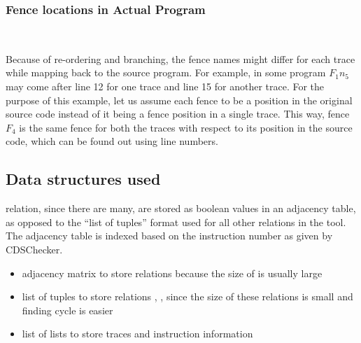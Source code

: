 \subsubsection{Fence locations in Actual Program}\

Because of re-ordering and branching, the fence names might 
differ for each trace while mapping back to the source program. 
For example, in some program $F_1n_5$ may come after line 12 
for one trace and line 15 for another trace. For the purpose of this 
example, let us assume each fence to be a position in the original 
source code instead of it being a fence position in a single trace. 
This way, fence $F_4$ is the same fence for both the traces 
with respect to its position in the source code, which can be found 
out using line numbers.

\subsection{Data structures used}
\lhb relation, since there are many, are stored as boolean values in 
an adjacency table, as opposed to the ``list of tuples'' format used for 
all other relations in the tool. The adjacency table is indexed based 
on the instruction number as given by CDSChecker. 

\begin{itemize}
	\item adjacency matrix to store \lhb relations because the size 
	of \lhb is usually large
	\item list of tuples to store relations \lmo, \lsb, \sc
	since the size of these relations is small and finding cycle is
	easier
	\item list of lists to store traces and instruction information
\end{itemize}

